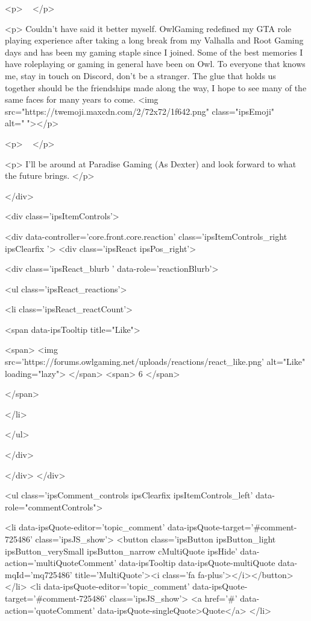 <p>
	 
</p>

<p>
	Couldn't have said it better myself. OwlGaming redefined my GTA role playing experience after taking a long break from my Valhalla and Root Gaming days and has been my gaming staple since I joined. Some of the best memories I have roleplaying or gaming in general have been on Owl. To everyone that knows me, stay in touch on Discord, don't be a stranger. The glue that holds us together should be the friendships made along the way, I hope to see many of the same faces for many years to come. <img src="https://twemoji.maxcdn.com/2/72x72/1f642.png" class="ipsEmoji" alt="🙂"></p>

<p>
	 
</p>

<p>
	I'll be around at Paradise Gaming (As Dexter) and look forward to what the future brings.
</p>


			
		</div>

		
			<div class='ipsItemControls'>
				
					
						

	<div data-controller='core.front.core.reaction' class='ipsItemControls_right ipsClearfix '>	
		<div class='ipsReact ipsPos_right'>
			
				
				<div class='ipsReact_blurb ' data-role='reactionBlurb'>
					
						

	
	<ul class='ipsReact_reactions'>
		
		
			
				
				<li class='ipsReact_reactCount'>
					
						<span data-ipsTooltip title="Like">
					
							<span>
								<img src='https://forums.owlgaming.net/uploads/reactions/react_like.png' alt="Like" loading="lazy">
							</span>
							<span>
								6
							</span>
					
						</span>
					
				</li>
			
		
	</ul>

					
				</div>
			
			
			
		</div>
	</div>

					
				
				<ul class='ipsComment_controls ipsClearfix ipsItemControls_left' data-role="commentControls">
					
						
							<li data-ipsQuote-editor='topic_comment' data-ipsQuote-target='#comment-725486' class='ipsJS_show'>
								<button class='ipsButton ipsButton_light ipsButton_verySmall ipsButton_narrow cMultiQuote ipsHide' data-action='multiQuoteComment' data-ipsTooltip data-ipsQuote-multiQuote data-mqId='mq725486' title='MultiQuote'><i class='fa fa-plus'></i></button>
							</li>
							<li data-ipsQuote-editor='topic_comment' data-ipsQuote-target='#comment-725486' class='ipsJS_show'>
								<a href='#' data-action='quoteComment' data-ipsQuote-singleQuote>Quote</a>
							</li>
						

